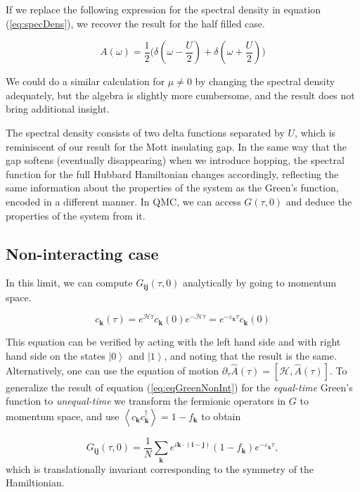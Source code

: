 If we replace the following expression for the spectral density in equation (\ref{eq:specDens}), we recover the result for the half filled case.

\begin{equation}
A ( \omega ) = \frac{1}{2} \bigg( \delta ( \omega - \frac{U}{2} ) + \delta ( \omega + \frac{U}{2} ) \bigg)
\end{equation}

We could do a similar calculation for $\mu \neq 0$ by changing the spectral density adequately, but the algebra is slightly more cumbersome, and the result does not bring additional insight.

The spectral density consists of two delta functions separated by $U$, which is reminiscent of our result for the Mott insulating gap.
In the same way that the gap softens (eventually disappearing) when we introduce hopping, the spectral function for the full Hubbard Hamiltonian changes accordingly, reflecting the same information about the properties of the system as the Green's function, encoded in a different manner.
In \acs{QMC}, we can access $G(\tau, 0)$ and deduce the properties of the system from it.

\subsection{Non-interacting case}

In this limit, we can compute $G_{\bm i \bm j} ( \tau, 0 )$ analytically by going to momentum space.

\begin{equation}
c_{\bm k} ( \tau ) = e^{ \mathcal{H} \tau } c_{\bm k} ( 0 ) e^{-\mathcal{H} \tau } = e^{-\varepsilon_{\bm k} \tau } c_{\bm k} ( 0 )
\end{equation}

This equation can be verified by acting with the left hand side and with right hand side on the states $\left| 0 \right\rangle$ and $\left| 1 \right\rangle$, and noting that the result is the same.
Alternatively, one can use the equation of motion $\partial_\tau \hat{A}(\tau) = [ \mathcal{H}, \hat{A} (\tau) ]$.
To generalize the result of equation (\ref{eq:eqGreenNonInt}) for the \emph{equal-time} Green's function to  \emph{unequal-time} we transform the fermionic operators in $G$ to momentum space, and use $\left\langle c_{\bm k} c_{\bm k}^\dagger \right\rangle = 1 - f_{\bm k}$ to obtain

\begin{equation}
G_{\bm i \bm j}(\tau, 0) = \frac{1}{N} \sum_{\bm k} e^{i \bm k \cdot (\bm i - \bm j )} ( 1 - f_{\bm k} ) e^{-\varepsilon_{\bm k} \tau } ,
\end{equation}
which is translationally invariant corresponding to the symmetry of the Hamiltionian.

